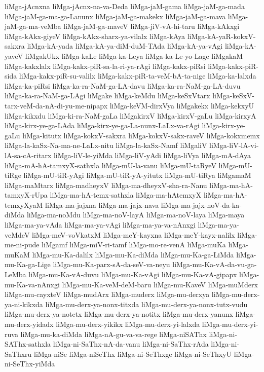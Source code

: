 {liMga-jAcnxna
liMga-jAcnx-na-va-Deda
liMga-jaM-gama
liMga-jaM-ga-mada
liMga-jaM-ga-ma-ga-Lanunx
liMga-jaM-ga-makekx
liMga-jaM-ga-mava
liMga-jaM-ga-ma-veMba
liMga-jaM-ga-maveV
liMga-jiV-vA-hi-taru
liMga-kAkxgi
liMga-kAkx-giyeV
liMga-kAkx-sharx-ya-vilalx
liMga-kAya
liMga-kA-yaR-kokxV-sakxra
liMga-kA-yada
liMga-kA-ya-diM-duM-TAda
liMga-kA-ya-vAgi
liMga-kA-yaveV
liMgakUkx
liMga-kaLe
liMga-ka-Leya
liMga-ka-Le-yo-Lage
liMgakaM
liMga-kakxlalx
liMga-kakx-piR-sa-la-ri-ya-rAgi
liMga-kakx-piRsi
liMga-kakx-piR-sida
liMga-kakx-piR-su-valilx
liMga-kakx-piR-ta-veM-bA-ta-nige
liMga-ka-lalxda
liMga-ka-piRsi
liMga-ka-ra-NaM-ga-LA-davu
liMga-ka-ra-NaM-ga-LA-duvu
liMga-ka-ra-NaM-ga-LAgi
liMgake
liMga-keMdu
liMga-keSxVtarx
liMga-keSxV-tarx-veM-da-nA-di-yu-me-nipapx
liMga-keVM-dirxVya
liMgakekx
liMga-kekxyU
liMga-kikxdu
liMga-ki-ra-NaM-gaLa
liMgakirxV
liMga-kirxV-gaLu
liMga-kirxyA
liMga-kirx-ye-ga-LAda
liMga-kirx-ye-ga-La-nunx-LaLx-va-rAgi
liMga-kirx-ye-gaLu
liMga-kitutx
liMga-kokxV-sakxra
liMga-kokxV-sakx-raveV
liMga-kokxmemx
liMga-la-kaSx-Na-ma-ne-LaLx-nitu
liMga-la-kaSx-Namf
liMgaliV
liMga-liV-lA-vi-lA-sa-cA-ritarx
liMga-liV-le-yiMda
liMga-liV-yAdi
liMga-liVya
liMga-mA-dAya
liMga-mA-hA-tamxyX-sathxla
liMga-mU-la-vanu
liMga-mU-taRyeV
liMga-mU-tiRge
liMga-mU-tiR-yAgi
liMga-mU-tiR-yA-yitutx
liMga-mU-tiRya
liMgamaM
liMga-maMtarx
liMga-madheyxV
liMga-ma-dheyxV-sha-ra-Nanu
liMga-ma-hA-tamxyX-rUpa
liMga-ma-hA-temx-sathxla
liMga-ma-hAtemxyX
liMga-ma-hA-temxyXyaM
liMga-ma-jajxna
liMga-ma-jajx-nava
liMga-ma-jajx-noV-da-ka-diMda
liMga-ma-noMdu
liMga-ma-noV-layA
liMga-ma-noV-laya
liMga-maya
liMga-ma-ya-vAda
liMga-ma-ya-vAgi
liMga-ma-ya-va-nAnxgi
liMga-ma-ya-veMdeV
liMga-meV-voVkatxM
liMga-meY-kayxna
liMga-meY-kayx-nalilx
liMga-me-ni-pude
liMgamf
liMga-miV-ri-tamf
liMga-mo-re-venA
liMga-muKa
liMga-muKaM
liMga-mu-Ka-dalilx
liMga-mu-Ka-diMda
liMga-mu-Ka-ga-LiMda
liMga-mu-Ka-ga-Lige
liMga-mu-Ka-parx-sA-da-seV-va-neyu
liMga-mu-Ka-vA-da-vu-ga-LeMba
liMga-mu-Ka-vA-duvu
liMga-mu-Ka-vAgi
liMga-mu-Ka-vA-gipapx
liMga-mu-Ka-va-nAnxgi
liMga-mu-Ka-veM-deM-baru
liMga-mu-KaveV
liMga-muMderx
liMga-mu-cayxteV
liMga-mudArx
liMga-muderx
liMga-mu-derxya
liMga-mu-derx-ya-ni-kikxda
liMga-mu-derx-ya-nonx-titxda
liMga-mu-derx-ya-nonx-tutx-vudu
liMga-mu-derx-ya-notetx
liMga-mu-derx-ya-notitx
liMga-mu-derx-yanunx
liMga-mu-derx-yidadx
liMga-mu-derx-yikikx
liMga-mu-derx-yi-lalxda
liMga-mu-derx-yi-ruva
liMga-mu-ka-diMda
liMga-nA-gu-va-va-rege
liMga-niSAThx
liMga-ni-SAThx-sathxla
liMga-ni-SaThx-nA-da-vanu
liMga-ni-SaThx-rAda
liMga-ni-SaThxru
liMga-niSe
liMga-niSeThx
liMga-ni-SeThxge
liMga-ni-SeThxyU
liMga-ni-SeThx-yiMda
}
